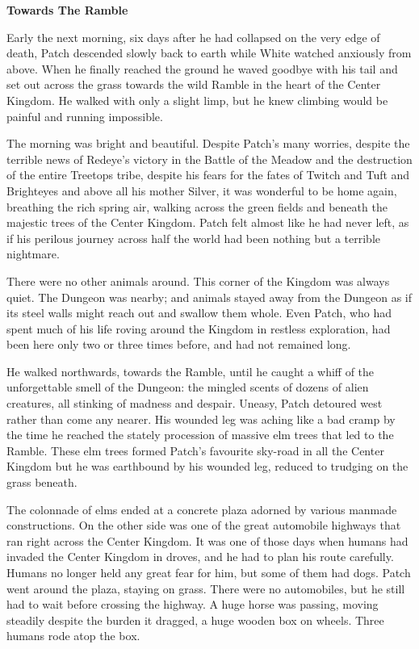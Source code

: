 \documentclass[11pt]{article}
\begin{document}
{\bf Towards The Ramble\par
}\par
 Early the next morning, six days after he had collapsed on the very edge of death, Patch descended slowly back to earth while White watched anxiously from above. When he finally reached the ground he waved goodbye with his tail and set out across the grass towards the wild Ramble in the heart of the Center Kingdom. He walked with only a slight limp, but he knew climbing would be painful and running impossible.\par
 The morning was bright and beautiful. Despite Patch's many worries, despite the terrible news of Redeye's victory in the Battle of the Meadow and the destruction of the entire Treetops tribe, despite his fears for the fates of Twitch and Tuft and Brighteyes and above all his mother Silver, it was wonderful to be home again, breathing the rich spring air, walking across the green fields and beneath the majestic trees of the Center Kingdom. Patch felt almost like he had never left, as if his perilous journey across half the world had been nothing but a terrible nightmare.\par
 There were no other animals around. This corner of the Kingdom was always quiet. The Dungeon was nearby; and animals stayed away from the Dungeon as if its steel walls might reach out and swallow them whole. Even Patch, who had spent much of his life roving around the Kingdom in restless exploration, had been here only two or three times before, and had not remained long. \par
 He walked northwards, towards the Ramble, until he caught a whiff of the unforgettable smell of the Dungeon: the mingled scents of dozens of alien creatures, all stinking of madness and despair. Uneasy, Patch detoured west rather than come any nearer. His wounded leg was aching like a bad cramp by the time he reached the stately procession of massive elm trees that led to the Ramble. These elm trees formed Patch's favourite sky-road in all the Center Kingdom %
 but he was earthbound by his wounded leg, reduced to trudging on the grass beneath.\par
 The colonnade of elms ended at a concrete plaza adorned by various manmade constructions. On the other side was one of the great automobile highways that ran right across the Center Kingdom. It was one of those days when humans had invaded the Center Kingdom in droves, and he had to plan his route carefully. Humans no longer held any great fear for him, but some of them had dogs. Patch went around the plaza, staying on grass. There were no automobiles, but he still had to wait before crossing the highway. A huge horse was passing, moving steadily despite the burden it dragged, a huge wooden box on wheels. Three humans rode atop the box.\par
\end{document}
